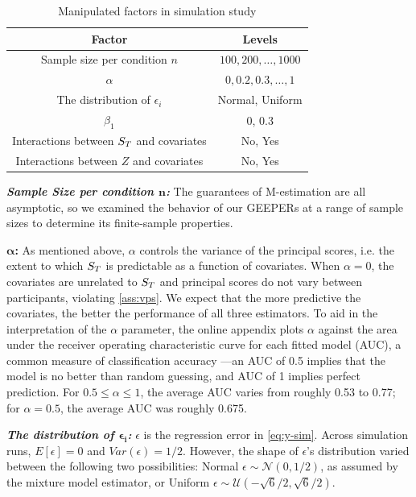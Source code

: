 \documentclass{statsoc} %
\begin{document}
\begin{table}
    \caption{\label{tab:factor} Manipulated factors in simulation study}
  \centering
\begin{tabular}{*{2}{c}}
  \hline
  Factor &Levels\\
  \hline
Sample size per condition $n$ &$100,200,\dots,1000$\\
$\alpha$ &$0,0.2,0.3,\dots,1$\\
The distribution of $\epsilon_i$& Normal, Uniform\\
$\beta_1$ & 0, 0.3\\
Interactions between $S_T$ and covariates & No, Yes\\
Interactions between $Z$ and covariates& No, Yes\\
\hline
  \end{tabular}
  \end{table}

\textbf{\emph{Sample Size per condition $\bm{n}$:}} The guarantees of M-estimation are all asymptotic, so we examined the behavior of our GEEPERs at a range of sample sizes to determine its finite-sample properties.

$\bm{\alpha}$\textbf{:} As mentioned above, $\alpha$ controls the variance of the principal scores, i.e. the extent to which $S_T$ is predictable as a function of covariates. When $\alpha=0$, the covariates are unrelated to $S_T$ and principal scores do not vary between participants, violating \eqref{ass:vps}. We expect that the more predictive the covariates, the better the performance of all three estimators.
To aid in the interpretation of the $\alpha$ parameter, the online appendix plots $\alpha$ against the area under the receiver operating characteristic curve for each fitted model (AUC), a common measure of classification accuracy \citep{bradley1997use}---an AUC of 0.5 implies that the model is no better than random guessing, and AUC of 1 implies perfect prediction. For $0.5\le \alpha \le 1$, the average AUC varies from roughly 0.53 to 0.77; for $\alpha=0.5$, the average AUC was roughly 0.675.


\textbf{\emph{The distribution of $\bm{\epsilon_i}$:}} $\epsilon$ is the regression error in \eqref{eq:y-sim}. Across simulation runs, $E[\epsilon]=0$ and $Var(\epsilon)=1/2$. However, the shape of $\epsilon$'s distribution varied between the following two possibilities:
Normal $\epsilon\sim\mathcal{N}(0,1/2)$, as assumed by the mixture model estimator, or Uniform $\epsilon\sim\mathcal{U}(-\sqrt{6}/2,\sqrt{6}/2)$.
\end{document}
